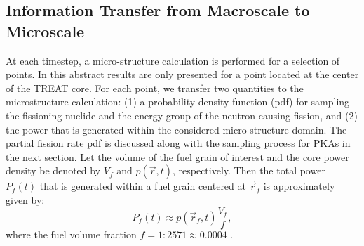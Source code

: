 \documentclass{anstrans}
\begin{document}
\subsection{Information Transfer from Macroscale to Microscale}
At each timestep, a micro-structure calculation is performed for a selection of points. In this abstract results are only presented for a point located at the center of the TREAT core. For each point, we transfer two quantities to the
microstructure calculation: (1) a probability density function (pdf) for sampling the fissioning nuclide and the energy group of the neutron causing fission, and (2) the power that is generated within the considered micro-structure domain. The partial fission rate pdf is discussed along with the sampling process for PKAs in the next section. Let the volume of the fuel grain of interest and the core power density be denoted by $V_f$ and $p(\vec{r},t)$, respectively. Then the total power $P_f(t)$ that is generated within a fuel grain centered at $\vec{r}_f$ is approximately given by:
\begin{equation}
     P_f(t) \approx p(\vec{r}_f,t) \frac{V_f}{f},
\end{equation}
where the fuel volume fraction $f = 1 : 2571 \approx 0.0004$ \cite{Mo2015}.

\end{document}
